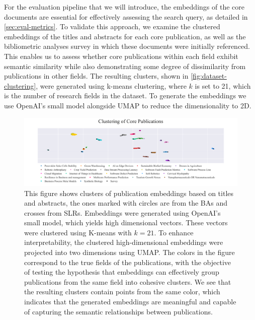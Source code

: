 For the evaluation pipeline that we will introduce, the embeddings of the core documents are essential for effectively assessing the search query, as detailed in \autoref{sec:eval-metrics}. To validate this approach, we examine the clustered embeddings of the titles and abstracts for each core publication, as well as the bibliometric analyses survey in which these documents were initially referenced. This enables us to assess whether core publications within each field exhibit semantic similarity while also demonstrating some degree of dissimilarity from publications in other fields. The resulting clusters, shown in \autoref{fig:dataset-clustering}, were generated using k-means clustering, where $k$ is set to 21, which is the number of research fields in the dataset. To generate the embeddings we use OpenAI's small model alongside UMAP \autocite{Healy2024} to reduce the dimensionality to 2D.

\begin{figure}
	\hspace*{-1cm}	
	\includegraphics[scale=0.45]{pics/umap_clustering.pdf}
	\caption[Core Publications Clustering]{This figure shows clusters of publication embeddings based on titles and abstracts, the ones marked with circles are from the BAs and crosses from SLRs. Embeddings were generated using OpenAI's small model, which yields high dimensional vectors. These vectors were clustered using K-means with $k=21$. To enhance interpretability, the clustered high-dimensional embeddings were projected into two dimensions using UMAP. The colors in the figure correspond to the true fields of the publications, with the objective of testing the hypothesis that embeddings can effectively group publications from the same field into cohesive clusters. We see that the resulting clusters contain points from the same color, which indicates that the generated embeddings are meaningful and capable of capturing the semantic relationships between publications.}
	\label{fig:dataset-clustering}
\end{figure}


